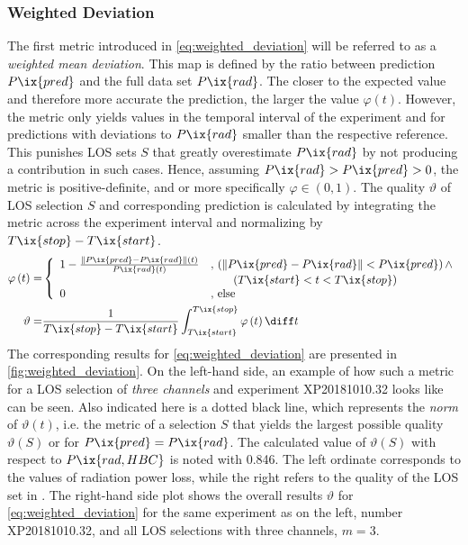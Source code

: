             \subsubsection*{Weighted Deviation}%
%
                The first metric introduced in \cref{eq:weighted_deviation} will be referred to as a \textit{weighted mean deviation}. This map is defined by the ratio between prediction $P\ix{pred}$ and the full data set $P\ix{rad}$. The closer to the expected value and therefore more accurate the prediction, the larger the value $\varphi\left(t\right)$. However, the metric only yields values in the temporal interval of the experiment and for predictions with deviations to $P\ix{rad}$ smaller than the respective reference. This punishes LOS sets $S$ that greatly overestimate $P\ix{rad}$ by not producing a contribution in such cases. Hence, assuming $P\ix{rad}>P\ix{pred}>0$, the metric is positive-definite, and or more specifically $\varphi\in\left(0, 1\right)$. The quality $\vartheta$ of LOS selection $S$ and corresponding prediction is calculated by integrating the metric across the experiment interval and normalizing by $T\ix{stop}-T\ix{start}$.%
%
                \begin{align}
                    \begin{split}\label{eq:weighted_deviation}%
                        \varphi\left(t\right)=&\left\{\begin{array}{ll}%
                            1-\frac{\left\|P\ix{pred}-P\ix{rad}\right\|\left(t\right)}{P\ix{rad}\left(t\right)}&,\,\left(\left\|P\ix{pred}-P\ix{rad}\right\|<P\ix{pred}\right)\land\\%
                            &\qquad\left(T\ix{start}<t<T\ix{stop}\right)\\%
                            0&,\,\text{else}%
                        \end{array}\right.\\%
                        \vartheta=&\frac{1}{T\ix{stop}-T\ix{start}}\int_{T\ix{start}}^{T\ix{stop}}\varphi \left(t\right)\diff t%
                    \end{split}%
                \end{align}%
%
                The corresponding results for \cref{eq:weighted_deviation} are presented in \cref{fig:weighted_deviation}. On the left-hand side, an example of how such a metric for a LOS selection of \textit{three channels} and experiment XP20181010.32 looks like can be seen. Also indicated here is a dotted black line, which represents the \textit{norm} of $\vartheta\left(t\right)$, i.e. the metric of a selection $S$ that yields the largest possible quality $\vartheta\left(S\right)$ or for $P\ix{pred}=P\ix{rad}$. The calculated value of $\vartheta\left(S\right)$ with respect to $P\ix{rad,HBC}$ is noted with 0.846. The left ordinate corresponds to the values of radiation power loss, while the right refers to the quality of the LOS set in \SI{}{\arbitraryunit}. The right-hand side plot shows the overall results $\vartheta$ for \cref{eq:weighted_deviation} for the same experiment as on the left, number XP20181010.32, and all LOS selections with three channels, $m=3$.\\%
